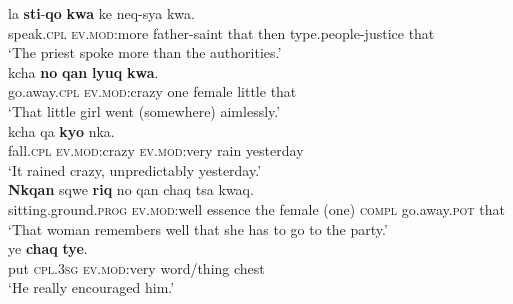 \documentclass[output=paper]{langsci/langscibook}
\begin{document}
\begin{exe}
	\ex\label{ex:CruzStump:23}
	 { {la}  } { \textbf{{sti}}-\textbf{{qo}}  } { \textbf{{kwa}}  } { {ke}  } { {neq}-{sya}  } { {kwa}.}\\
	 { speak.\textsc{cpl} } { \textsc{ev.mod}:more } { father-saint } { that } { then } { type.people-justice } { that}\\
	\glt `The priest spoke more than the authorities.'\\



	\ex\label{ex:CruzStump:24}
	 { {kcha}  } { \textbf{{no}}  } { \textbf{{qan}}    } { \textbf{{lyuq}} } { \textbf{{kwa}}.}\\
	 {go.away.\textsc{cpl} } { \textsc{ev.mod}:crazy } { one } { female } { little } { that}\\
	\glt `That little girl went (somewhere) aimlessly.'\\



	\ex\label{ex:CruzStump:25}
	 {  {kcha} } {  {qa}  } { \textbf{{kyo}}  } { {nka}.}\\
	 { fall.\textsc{cpl} } { \textsc{ev.mod}:crazy } { \textsc{ev.mod}:very } { rain } { yesterday}\\
	\glt `It rained crazy, unpredictably yesterday.'\\



	\ex\label{ex:CruzStump:26}
	\gll
	\small
	 {\textbf{{Nkqan}} } {{sqwe}} {\textbf{{riq}} } {{no}} {{qan}} {{chaq} } {{tsa} } {{kwaq}.}\\
	 {sitting.ground.\textsc{prog}} {\textsc{ev.mod}:well} {essence} {the} {female (one) } {\textsc{compl}} {go.away.\textsc{pot}} {that}\\
	\glt `That woman remembers well that she has to go to the party.'\\



	\ex\label{ex:CruzStump:27}
	 {{ye}} {\textbf{{chaq}}} { \textbf{{tye}}.}\\
	 {put \textsc{cpl}.\textsc{3sg}} {\textsc{ev.mod}:very} { word/thing  } {chest}\\
	\glt `He really encouraged him.'\\




\end{exe}
\end{document}
